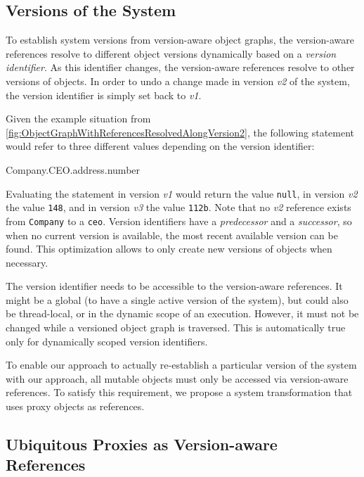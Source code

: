 \documentclass{sigplanconf}
\begin{document}
\subsection{Versions of the System}
\label{sec:versions-system}

To establish system versions from version-aware object graphs, the version-aware references resolve to different object versions dynamically based on a \emph{version identifier}.
As this identifier changes, the version-aware references resolve to other versions of objects.
In order to undo a change made in version \emph{v2} of the system, the version identifier is simply set back to \emph{v1}.

Given the example situation from \autoref{fig:ObjectGraphWithReferencesResolvedAlongVersion2}, the following statement would refer to three different values depending on the version identifier:

\begin{code}
Company.CEO.address.number
\end{code}

Evaluating the statement in version \emph{v1} would return the value \lstinline{null}, in version \emph{v2} the value \lstinline{148}, and in version \emph{v3} the value \lstinline{112b}.
Note that no \emph{v2} reference exists from \lstinline{Company} to a \lstinline{ceo}.
Version identifiers have a \emph{predecessor} and a \emph{successor}, so when no current version is available, the most recent available version can be found.
This optimization allows to only create new versions of objects when necessary.

The version identifier needs to be accessible to the version-aware references.
It might be a global (to have a single active version of the system), but could also be thread-local, or in the dynamic scope of an execution.
However, it must not be changed while a versioned object graph is traversed.
This is automatically true only for dynamically scoped version identifiers.

To enable our approach to actually re-establish a particular version of the system with our approach, all mutable objects must only be accessed via version-aware references. To satisfy this requirement, we propose a system transformation that uses proxy objects as references.

\subsection{Ubiquitous Proxies as Version-aware References} \label{sec:APPROACH:2}
\end{document}
